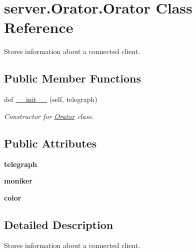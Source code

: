 \hypertarget{classserver_1_1Orator_1_1Orator}{}\section{server.\+Orator.\+Orator Class Reference}
\label{classserver_1_1Orator_1_1Orator}


Stores information about a connected client.  


\subsection*{Public Member Functions}
\begin{DoxyCompactItemize}
\item 
def \hyperlink{classserver_1_1Orator_1_1Orator_a173c8497b251bba46514f28e089597eb}{\+\_\+\+\_\+init\+\_\+\+\_\+} (self, telegraph)
\begin{DoxyCompactList}\small\item\em Constructor for \hyperlink{classserver_1_1Orator_1_1Orator}{Orator} class. \end{DoxyCompactList}\end{DoxyCompactItemize}
\subsection*{Public Attributes}
\begin{DoxyCompactItemize}
\item 
{\bfseries telegraph}\hypertarget{classserver_1_1Orator_1_1Orator_a87ae5421efc0e5f4ccce21d04cb921f4}{}\label{classserver_1_1Orator_1_1Orator_a87ae5421efc0e5f4ccce21d04cb921f4}

\item 
{\bfseries moniker}\hypertarget{classserver_1_1Orator_1_1Orator_a153d7720e2e5f6b7c41c67333a1390ba}{}\label{classserver_1_1Orator_1_1Orator_a153d7720e2e5f6b7c41c67333a1390ba}

\item 
{\bfseries color}\hypertarget{classserver_1_1Orator_1_1Orator_a1a5fc663a1e5aaa7d58fbcf05829d882}{}\label{classserver_1_1Orator_1_1Orator_a1a5fc663a1e5aaa7d58fbcf05829d882}

\end{DoxyCompactItemize}


\subsection{Detailed Description}
Stores information about a connected client. 

